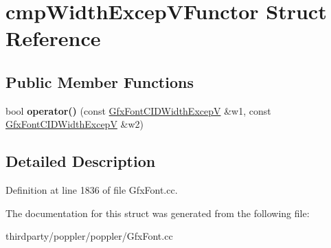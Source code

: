 \hypertarget{structcmp_width_excep_v_functor}{}\section{cmp\+Width\+Excep\+V\+Functor Struct Reference}
\label{structcmp_width_excep_v_functor}
\subsection*{Public Member Functions}
\begin{DoxyCompactItemize}
\item 
\mbox{\label{structcmp_width_excep_v_functor_a1795756a4a78cc295a9a32dff2e11add}} 
bool {\bfseries operator()} (const \hyperlink{struct_gfx_font_c_i_d_width_excep_v}{Gfx\+Font\+C\+I\+D\+Width\+ExcepV} \&w1, const \hyperlink{struct_gfx_font_c_i_d_width_excep_v}{Gfx\+Font\+C\+I\+D\+Width\+ExcepV} \&w2)
\end{DoxyCompactItemize}


\subsection{Detailed Description}


Definition at line 1836 of file Gfx\+Font.\+cc.



The documentation for this struct was generated from the following file\+:\begin{DoxyCompactItemize}
\item 
thirdparty/poppler/poppler/Gfx\+Font.\+cc\end{DoxyCompactItemize}
